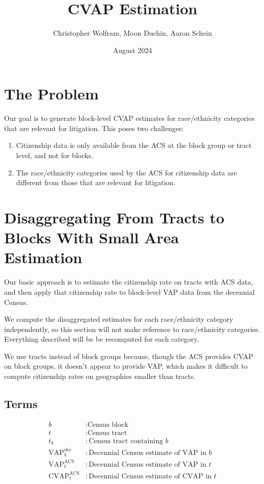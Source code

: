 \documentclass{article}
\title{CVAP Estimation}
\author{Christopher Wolfram, Moon Duchin, Aaron Schein}
\date{August 2024}
\newcommand{\vap}[1]{\text{VAP}^\text{#1}}
\newcommand{\cvap}[1]{\text{CVAP}^\text{#1}}
\begin{document}
\maketitle

\section{The Problem}
Our goal is to generate block-level CVAP estimates for race/ethnicity categories that are relevant for litigation. This poses two challenges:
\begin{enumerate}
    \item Citizenship data is only available from the ACS at the block group or tract level, and not for blocks.
    \item The race/ethnicity categories used by the ACS for citizenship data are different from those that are relevant for litigation.
\end{enumerate}

\section{Disaggregating From Tracts to Blocks With Small Area Estimation}
Our basic approach is to estimate the citizenship rate on tracts with ACS data, and then apply that citizenship rate to block-level VAP data from the decennial Census.

We compute the disaggregated estimates for each race/ethnicity category independently, so this section will not make reference to race/ethnicity categories. Everything described will be be recomputed for each category.

We use tracts instead of block groups because, though the ACS provides CVAP on block groups, it doesn't appear to provide VAP, which makes it difficult to compute citizenship rates on geographies smaller than tracts.

\subsection{Terms}

\begin{align*}
    b &: \text{Census block} \\
    t &: \text{Census tract} \\
    t_b &: \text{Census tract containing $b$} \\
    \vap{dec}_b &: \text{Decennial Census estimate of VAP in $b$} \\
    \vap{ACS}_t &: \text{Decennial Census estimate of VAP in $t$} \\
    \cvap{ACS}_t &: \text{Decennial Census estimate of CVAP in $t$}
\end{align*}
\end{document}
